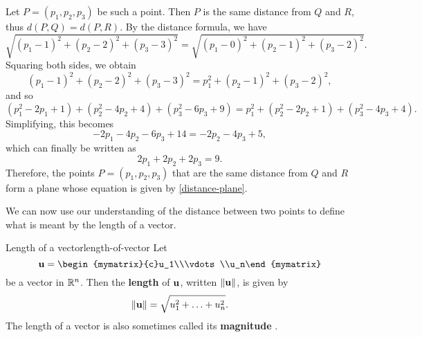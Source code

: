 \begin{solution}
  Let $P = (p_1,p_2,p_3)$ be such a point. Then $P$ is the same
  distance from $Q$ and $R$, thus $d(P,Q)=d(P,R)$. By the distance
  formula, we have
  \begin{equation*}
    \sqrt{(p_1-1)^{2}+(p_2-2)^{2}+(p_3-3)^{2}}=
    \sqrt{(p_1-0)^{2}+(p_2-1)^{2}+(p_3-2)^{2}}.
  \end{equation*}
  Squaring both sides, we obtain
  \begin{equation*}
    (p_1 -1) ^{2}+(p_2 -2) ^{2}+(p_3 -3)
    ^{2}=p_1^{2}+(p_2-1) ^{2}+(p_3 -2) ^{2},
  \end{equation*}
  and so
  \begin{equation*}
    \allowbreak (p_1^{2}-2p_1+1)+(p_2^{2}-4p_2+4)+(p_3^{2}-6p_3+9)=p_1^{2}+(p_2^{2}-2p_2+1)+(p_3^{2}-4p_3+4).
  \end{equation*}
  Simplifying, this becomes
  \begin{equation*}
    -2p_1-4p_2-6p_3+14=-2p_2-4p_3+5,
  \end{equation*}
  which can finally be written as
  \begin{equation}\label{distance-plane}
    2p_1+2p_2+2p_3=9.
  \end{equation}
  Therefore, the points $P = (p_1,p_2,p_3)$ that are the same
  distance from $Q$ and $R$ form a plane whose equation is given by
  \eqref{distance-plane}.
\end{solution}

We can now use our understanding of the distance between two points to
define what is meant by the length of a vector.

\begin{definition}{Length of a vector}{length-of-vector}
  Let
  \begin{equation*}
    \vect{u} = \begin{mymatrix}{c}u_1\\\vdots\\u_n\end{mymatrix}
  \end{equation*}
  be a vector in $\mathbb{R}^n$. Then the
  \textbf{length} of
  $\mbox{\bf u}$, written $\left\|\mbox{\bf u}\right\|$, is given by
  \begin{equation*}
    \left\|\mbox{\bf u}\right\| = \sqrt{u_{1}^2 + \ldots + u_{n}^2}.
  \end{equation*}
  The length of a vector is also sometimes called its
  \textbf{magnitude}%
  .
\end{definition}

